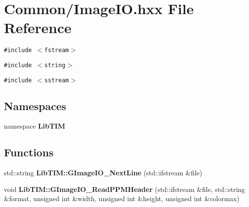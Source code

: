 \section{Common/Image\-IO.hxx File Reference}
\label{ImageIO_8hxx}
{\tt \#include $<$fstream$>$}\par
{\tt \#include $<$string$>$}\par
{\tt \#include $<$sstream$>$}\par
\subsection*{Namespaces}
\begin{CompactItemize}
\item 
namespace {\bf Lib\-TIM}
\end{CompactItemize}
\subsection*{Functions}
\begin{CompactItemize}
\item 
std::string {\bf Lib\-TIM::GImage\-IO\_\-Next\-Line} (std::ifstream \&file)
\item 
void {\bf Lib\-TIM::GImage\-IO\_\-Read\-PPMHeader} (std::ifstream \&file, std::string \&format, unsigned int \&width, unsigned int \&height, unsigned int \&colormax)
\end{CompactItemize}

